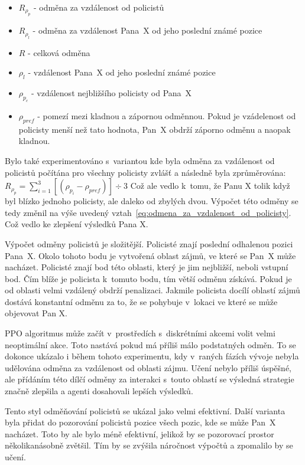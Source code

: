 \begin{itemize}
  \item $R_{\rho_p}$ - odměna za vzdálenost od policistů
  \item $R_{\rho_l}$ - odměna za vzdálenost Pana~X od jeho poslední známé pozice
  \item $R$ - celková odměna
  \item $\rho_l$ - vzdálenost Pana~X od jeho poslední známé pozice
  \item $\rho_{p_c}$ - vzdálenost nejbližšího policisty od Pana~X
  \item $\rho_{pref}$ - pomezí mezi kladnou a zápornou odměnnou.
  Pokud je vzádelenost od policisty menší než tato hodnota, Pan~X obdrží záporno odměnu a naopak kladnou.
\end{itemize}

Bylo také experimentováno s~variantou kde byla odměna za vzdálenost od policistů počítána pro všechny policisty zvlášť a následně byla zprůměrována:
$  R_{\rho_p} = \sum_{i=1}^{3}[(\rho_{p_i} - \rho_{pref})] \div 3$
Což ale vedlo k~tomu, že Panu X tolik  když byl blízko jednoho policisty, ale daleko od zbylých dvou.
Výpočet této odměny se tedy změnil na výše uvedený vztah~\ref{eq:odmena_za_vzdalenost_od_policisty}.
Což vedlo ke zlepšení výsledků Pana X.

Výpočet odměny policistů je složitější.
Policisté znají poslední odhalenou pozici Pana~X\@.
Okolo tohoto bodu je vytvořená oblast zájmů, ve které se Pan~X může nacházet.
Policisté znají bod této oblasti, který je jim nejbližší, neboli vstupní bod.
Čím blíže je policista k~tomuto bodu, tím větší odměnu získává.
Pokud je od oblasti velmi vzdálený obdrží penalizaci.
Jakmile policista docílí oblastí zájmů dostává konstantní odměnu za to, že se pohybuje v~lokaci ve které se může objevovat Pan X.

PPO algoritmus může začít v~prostředích s~diskrétními akcemi volit velmi neoptimální akce.
Toto nastává pokud má příliš málo podstatných odměn\cite{PPO_weakness}.
To se dokonce ukázalo i během tohoto experimentu, kdy v~raných fázích vývoje nebyla udělována odměna za vzdálenost od oblasti zájmu.
Učení nebylo příliš úspěšné, ale přídáním této dílčí odměny za interakci s~touto oblastí se výsledná strategie značně zlepšila a agenti dosahovali lepších výsledků.

Tento styl odměňování policistů se ukázal jako velmi efektivní.
Další varianta byla přidat do pozorování policistů pozice všech pozic, kde se může Pan~X nacházet.
Toto by ale bylo méně efektivní, jelikož by se pozorovací prostor několikanásobně zvětšil.
Tím by se zvýšila náročnost výpočtů a zpomalilo by se učení.
